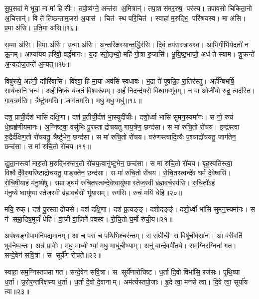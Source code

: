 सू॒प॒सदा॑ मे भूया॒ मा मा॑ हिसीः। तपो॒ष्व॑ग्ने॒ अन्त॑रा अ॒मित्रान्॑। तपा॒शस॑मर॒रुष॒ पर॑स्य। तपा॑वसो चिकिता॒नो अ॒चित्तान्॑। वि ते॑ तिष्ठन्ताम॒जरा॑ अ॒यास॑। चित॑ स्थ परि॒चित॑। स्वाहा॑ म॒रुद्भि॒ परि॑श्रयस्व। मा अ॑सि। प्र॒मा अ॑सि। प्र॒ति॒मा अ॑सि॥१६॥

स॒म्मा अ॑सि। वि॒मा अ॑सि। उ॒न्मा अ॑सि। अ॒न्तरि॑क्षस्यान्त॒र्द्धिर॑सि। दिवं॒ तप॑सस्त्रायस्व। आ॒भिर्गी॒र्भिर्यदतो॑ न ऊ॒नम्। आप्या॑यय हरिवो॒ वर्द्ध॑मानः। य॒दा स्तो॒तृभ्यो॒ महि॑ गो॒त्रा रु॒जासि॑। भू॒यि॒ष्ठ॒भाजो॒ अध॑ ते स्याम। शु॒क्रन्ते॑ अ॒न्यद्य॑ज॒तन्ते॑ अ॒न्यत्॥१७॥

विषु॑रूपे॒ अह॑नी॒ द्यौरि॑वासि। विश्वा॒ हि मा॒या अव॑सि स्वधावः। भ॒द्रा ते॑ पूषन्नि॒ह रा॒तिर॑स्तु। अर्\mbox{}ह॑न्बिभर्\mbox{}षि॒ साय॑कानि॒ धन्व॑। अर्\mbox{}हं नि॒ष्कं य॑ज॒तं  वि॒श्वरू॑पम्। अर्\mbox{}हं॑ नि॒दन्द॑यसे॒ विश्व॒मब्भु॑वम्। न वा ओजी॑यो रुद्र॒ त्वद॑स्ति। गा॒य॒त्रम॑सि। त्रैष्टु॑भमसि। जाग॑तमसि। मधु॒ मधु॒ मधु॑॥१८॥
\anuvakamend[अ॒न॒क्त्व॒सा॒दी॒दु॒त्त॒र॒तः पा॑हि प्रति॒मा अ॑सि यज॒तन्ते॑ अ॒न्यज्जाग॑तम॒स्येकं॑ च]

दश॒ प्राची॒र्दश॑ भासि दक्षि॒णा। दश॑ प्र॒तीची॒र्दश॑ भा॒स्युदी॑चीः। दशो॒र्ध्वा भा॑सि सुमन॒स्यमा॑नः। स नो॒ रुचं॑ धे॒ह्यहृ॑णीयमानः। अ॒ग्निष्ट्वा॒ वसु॑भिः पु॒रस्ताद्रोचयतु गाय॒त्रेण॒ छन्द॑सा। स मा॑ रुचि॒तो रो॑चय। इन्द्र॑स्त्वा रु॒द्रैर्द॑क्षिण॒तो रो॑चयतु॒ त्रैष्टु॑भेन॒ छन्द॑सा। स मा॑ रुचि॒तो रो॑चय। वरु॑णस्त्वादि॒त्यैः प॒श्चाद्रो॑चयतु॒ जाग॑तेन॒ छन्द॑सा। स मा॑ रुचि॒तो रो॑चय॥१९॥

द्यु॒ता॒नस्त्वा॑ मारु॒तो म॒रुद्भि॑रुत्तर॒तो रो॑चय॒त्वानु॑ष्टुभेन॒ छन्द॑सा। स मा॑ रुचि॒तो रो॑चय। बृह॒स्पति॑स्त्वा॒ विश्वैर्दे॒वैरु॒परि॑ष्टाद्रोचयतु॒ पाङ्क्ते॑न॒ छन्द॑सा। स मा॑ रुचि॒तो रो॑चय। रो॒चि॒तस्त्वन्दे॑व घर्म दे॒वेष्वसि॑। रो॒चि॒षी॒याहं म॑नु॒ष्ये॑षु। सम्राड्घर्म रुचि॒तस्त्वन्दे॒वेष्वायु॑ष्मास्तेज॒स्वी ब्र॑ह्मवर्च॒स्य॑सि। रु॒चि॒तो॑ऽहं म॑नु॒ष्येष्वायु॑ष्मास्तेज॒स्वी ब्र॑ह्मवर्च॒सी भू॑यासम्। रुग॑सि। रुचं॒ मयि॑ धेहि॥२०॥

मयि॒ रुक्। दश॑ पु॒रस्ताद्रोचसे। दश॑ दक्षि॒णा। दश॑ प्र॒त्यङ्ङ्। दशोदङ्ङ्॑। दशो॒र्ध्वो भा॑सि सुमन॒स्यमा॑नः। स न॑ सम्रा॒डिष॒मूर्जं॑ धेहि। वा॒जी वा॒जिने॑ पवस्व। रो॒चि॒तो घ॒र्मो रु॑ची॒य॥२१॥
\anuvakamend[रो॒च॒य॒ धे॒हि॒ नव॑ च]

अप॑श्यङ्गो॒पामनि॑पद्यमानम्। आ च॒ परा॑ च प॒थिभि॒श्चर॑न्तम्। स स॒ध्रीची॒ स विषू॑ची॒र्वसा॑नः। आ व॑रीवर्ति॒ भुव॑नेष्व॒न्तः। अत्र॑ प्रा॒वीः। मधु॒ माध्वीभ्यां॒ मधु॒ माधू॑चीभ्याम्। अनु॑ वान्दे॒ववी॑तये। सम॒ग्निर॒ग्निना॑ गत। सन्दे॒वेन॑ सवि॒त्रा। स सूर्ये॑ण रोचते॥२२॥

स्वाहा॒ सम॒ग्निस्तप॑सा गत। सन्दे॒वेन॑ सवि॒त्रा। स सूर्ये॑णारोचिष्ट। ध॒र्ता दि॒वो विभा॑सि॒ रज॑सः। पृ॒थि॒व्या ध॒र्ता। उ॒रोर॒न्तरि॑क्षस्य ध॒र्ता। ध॒र्ता दे॒वो दे॒वानाम्। अम॑र्त्यस्तपो॒जाः। हृ॒दे त्वा॒ मन॑से त्वा। दि॒वे त्वा॒ सूर्या॑य त्वा॥२३॥

